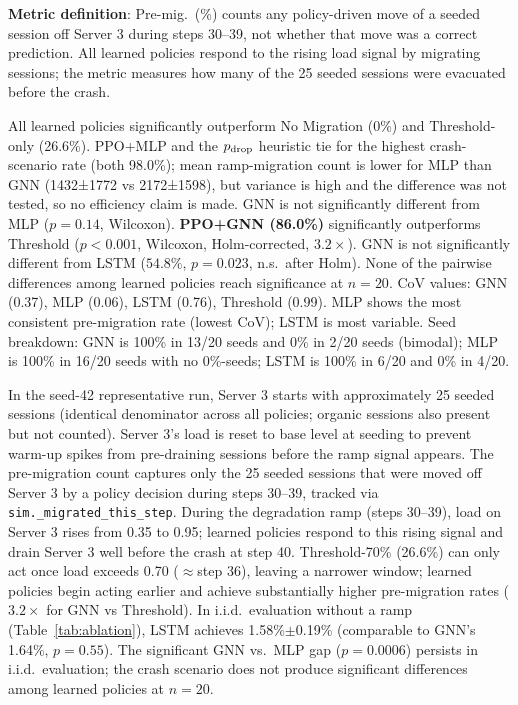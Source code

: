 \documentclass[review,1p]{elsarticle}
\theoremstyle{definition}
\begin{document}
\begin{sloppypar}
\textbf{Metric definition}: Pre-mig.\ (\%) counts any policy-driven move of a seeded session
off Server 3 during steps 30--39, not whether that move was a correct prediction.
All learned policies respond to the rising load signal by migrating sessions;
the metric measures how many of the 25 seeded sessions were evacuated before the crash.

All learned policies significantly outperform No Migration (0\%) and Threshold-only
(26.6\%).  PPO+MLP and the $p_{\rm drop}$ heuristic tie for the highest crash-scenario rate
(both 98.0\%); mean ramp-migration count is lower for MLP than GNN (1432±1772 vs 2172±1598),
but variance is high and the difference was not tested, so no efficiency claim is made.
GNN is not significantly different from MLP ($p{=}0.14$, Wilcoxon).
\textbf{PPO+GNN (86.0\%)} significantly outperforms Threshold
($p{<}0.001$, Wilcoxon, Holm-corrected, $3.2\times$).
GNN is not significantly different from LSTM ($54.8\%$, $p{=}0.023$, n.s.\ after Holm).
None of the pairwise differences among learned policies reach significance at $n{=}20$.
CoV values: GNN (0.37), MLP (0.06), LSTM (0.76), Threshold (0.99).
MLP shows the most consistent pre-migration rate (lowest CoV); LSTM is most variable.
Seed breakdown: GNN is 100\% in 13/20 seeds and 0\% in 2/20 seeds (bimodal);
MLP is 100\% in 16/20 seeds with no 0\%-seeds; LSTM is 100\% in 6/20 and 0\% in 4/20.
\end{sloppypar}

In the seed-42 representative run, Server 3 starts with approximately 25 seeded sessions
(identical denominator across all policies; organic sessions also present but not counted).
Server 3's load is reset to base level at seeding to prevent warm-up spikes
from pre-draining sessions before the ramp signal appears.
The pre-migration count captures only the 25 seeded sessions
that were moved off Server 3 by a policy decision during steps 30--39,
tracked via \texttt{sim.\_migrated\_this\_step}.
During the degradation ramp (steps 30--39), load on Server 3 rises from 0.35
to 0.95; learned policies respond to this rising signal and drain Server 3
well before the crash at step 40.
Threshold-70\% (26.6\%) can only act once load exceeds 0.70 ($\approx$step 36),
leaving a narrower window; learned policies begin acting earlier and achieve
substantially higher pre-migration rates ($3.2\times$ for GNN vs Threshold).
In i.i.d.\ evaluation without a ramp (Table~\ref{tab:ablation}),
LSTM achieves 1.58\%$\pm$0.19\% (comparable to GNN's 1.64\%, $p{=}0.55$).
The significant GNN vs.\ MLP gap ($p{=}0.0006$) persists in i.i.d.\
evaluation; the crash scenario does not produce significant differences
among learned policies at $n{=}20$.
\end{document}
